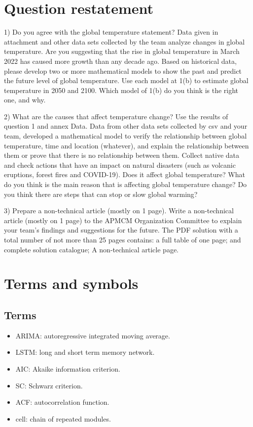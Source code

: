\documentclass{apmcmthesis}
\begin{document}
  \section{Question restatement}
  
  1) Do you agree with the global temperature statement? 
  Data given in attachment and other data sets collected by the team analyze changes in global temperature.
  Are you suggesting that the rise in global temperature in March 2022 has caused more growth than any decade ago.
  Based on historical data, please develop two or more mathematical models to show the past and predict the future level of global temperature.
  Use each model at 1(b) to estimate global temperature in 2050 and 2100.
  Which model of 1(b) do you think is the right one, and why.
  
  2) What are the causes that affect temperature change?
  Use the results of question 1 and annex Data. 
  Data from other data sets collected by csv and your team, developed a mathematical model to verify the relationship between global temperature, 
  time and location (whatever), and explain the relationship between them or prove that there is no relationship between them.
  Collect native data and check actions that have an impact on natural disasters (such as volcanic eruptions, forest fires and COVID-19). 
  Does it affect global temperature? 
  What do you think is the main reason that is affecting global temperature change?
  Do you think there are steps that can stop or slow global warming?
  
  3) Prepare a non-technical article (mostly on 1 page). Write a non-technical article (mostly on 1 page) 
  to the APMCM Organization Committee to explain your team's findings and suggestions for the future.
  The PDF solution with a total number of not more than 25 pages contains: 
  a full table of one page; and complete solution catalogue; A non-technical article page.
  
  \section{Terms and symbols}
  \subsection{Terms}
  \begin{itemize}
    \item ARIMA: autoregressive integrated moving average.
    \item LSTM: long and short term memory network.
    \item AIC: Akaike information criterion.
    \item SC: Schwarz criterion.
    \item ACF: autocorrelation function.
    \item cell: chain of repeated modules.
  \end{itemize}
  
\end{document}
